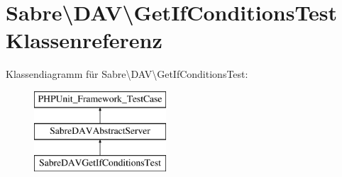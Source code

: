 \hypertarget{class_sabre_1_1_d_a_v_1_1_get_if_conditions_test}{}\section{Sabre\textbackslash{}D\+AV\textbackslash{}Get\+If\+Conditions\+Test Klassenreferenz}
\label{class_sabre_1_1_d_a_v_1_1_get_if_conditions_test}
Klassendiagramm für Sabre\textbackslash{}D\+AV\textbackslash{}Get\+If\+Conditions\+Test\+:\begin{figure}[H]
\begin{center}
\leavevmode
\includegraphics[height=3.000000cm]{class_sabre_1_1_d_a_v_1_1_get_if_conditions_test}
\end{center}
\end{figure}
